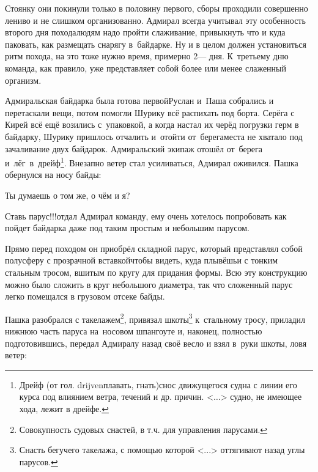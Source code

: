 Стоянку они покинули только в половину первого, сборы проходили совершенно лениво и не слишком организованно. Адмирал всегда учитывал эту особенность второго дня похода\mdash людям надо пройти слаживание, привыкнуть что и куда паковать, как размещать снарягу в~байдарке. Ну и в целом должен установиться ритм похода, на это тоже нужно время, примерно 2\thinspace\nobreakdash--- дня. К~третьему дню команда, как правило, уже представляет собой более или менее слаженный организм. 

\renewcommand*{\thefootnote}{\fnsymbol{footnote}}
\setcounter{footnote}{0}
Адмиральская байдарка была готова первой\mdash Руслан и~Паша собрались и перетаскали вещи, потом помогли Шурику всё распихать под борта. Серёга с Кирей всё ещё возились с~упаковкой, а когда настал их черёд погрузки герм в байдарку, Шурику пришлось отчалить и~отойти от~берега\mdash места не хватало под зачаливание двух байдарок. Адмиральский экипаж отошёл от~берега и~лёг~в~дрейф\footnote{Дрейф (от гол. drijven\mdash плавать, гнать)\mdash снос движущегося судна с линии его курса под влиянием ветра, течений и др. причин. <$\ldots$> судно, не имеющее хода, лежит в дрейфе.}. Внезапно ветер стал усиливаться, Адмирал оживился. Пашка обернулся на носу байды:

\diagdash Ты думаешь о том же, о чём и я?

\diagdash Ставь парус!!!\mdash отдал Адмирал команду, ему очень хотелось попробовать как пойдет байдарка даже под таким простым и небольшим парусом. 

Прямо перед походом он приобрёл складной парус, который представлял собой полусферу с прозрачной вставкой\mdash чтобы видеть, куда плывёшь\mdash и с тонким стальным тросом, вшитым по кругу для придания формы. Всю эту конструкцию можно было сложить в круг небольшого диаметра, так что сложенный парус легко помещался в грузовом отсеке байды.

\begingroup
\justifying
\parfillskip=0pt %

\renewcommand*{\thefootnote}{\arabic{footnote}}
\setcounter{footnote}{0}
Пашка разобрался с такелажем\footnote{Совокупность судовых снастей, в т.ч. для управления парусами.}, привязал шкоты\footnote{Снасть бегучего такелажа, с помощью которой <...> оттягивают назад углы парусов.} к~стальному тросу, приладил нижнюю часть паруса на~носовом шпангоуте и, наконец, полностью подготовившись, передал Адмиралу назад своё весло и взял в~руки шкоты, ловя ветер:


